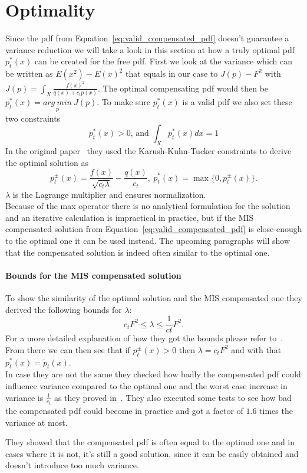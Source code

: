 \section{Optimality}
\label{sec:misc_optimality}
Since the pdf from Equation~\ref{eq:valid_compensated_pdf} doesn't guarantee a variance reduction
we will take a look in this section at how a truly optimal pdf $ p_t^*(x) $ can be created for the free pdf.
First we look at the variance
which can be written as $ E(x^2) - E(x)^2 $ that equals in our case to $ J(p) - F^2 $ with $ J(p) = \int_X \frac{f(x)^2}{q(x) + c_t p(x)} $.
The optimal compensating pdf would then be $ p_t^*(x) = \underset{p}{arg~min}~J(p) $.
To make sure $ p_t^*(x) $ is a valid pdf we also set these two constraints $$ p_t^*(x) > 0 \text{, and } \int_X p_t^*(x) dx = 1 $$
In the original paper~\cite[Appendix~A]{Karlik2019} they used the Karush-Kuhn-Tucker constraints
to derive the optimal solution as $$ p_t^{\pm}(x) = \frac{f(x)}{\sqrt{c_t \lambda}} - \frac{q(x)}{c_t},~p_t^*(x) = \max\{0, p_t^{\pm}(x)\}. $$
$ \lambda $ is the Lagrange multiplier and ensures normalization.\\
Because of the max operator there is no analytical formulation for the solution and an iterative calculation is impractical in practice,
but if the MIS compensated solution from Equation~\ref{eq:valid_compensated_pdf} is close-enough to the optimal one it can be used instead.
The upcoming paragraphs will show that the compensated solution is indeed often similar to the optimal one.

\paragraph{Bounds for the MIS compensated solution}
To show the similarity of the optimal solution and the MIS compensated one
they derived the following bounds for $ \lambda $: $$ c_t F^2 \leq \lambda \leq \frac{1}{ct} F^2. $$
For a more detailed explanation of how they got the bounds please refer to~\cite[Appendix~B]{Karlik2019}.
From there we can then see that if $ p_t^{\pm}(x) > 0 $ then $ \lambda = c_t F^2 $ and with that $ p_t^*(x) = \tilde{p}_t(x) $.\\
In case they are not the same they checked how badly the compensated pdf could influence variance compared to the optimal one
and the worst case increase in variance is $ \frac{1}{c_t} $ as they proved in~\cite[Appendix~C]{Karlik2019}.
They also executed some tests to see how bad the compensated pdf could become in practice
and got a factor of $ 1.6 $ times the variance at most.

They showed that the compensated pdf is often equal to the optimal one
and in cases where it is not,
it's still a good solution,
since it can be easily obtained and doesn't introduce too much variance.
